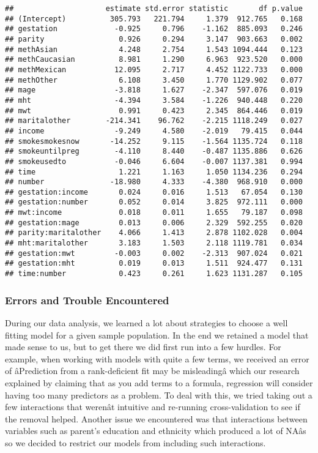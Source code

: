 \documentclass[]{article}
\begin{document}
\begin{verbatim}
##                     estimate std.error statistic       df p.value
## (Intercept)          305.793   221.794     1.379  912.765   0.168
## gestation             -0.925     0.796    -1.162  885.093   0.246
## parity                 0.926     0.294     3.147  903.663   0.002
## methAsian              4.248     2.754     1.543 1094.444   0.123
## methCaucasian          8.981     1.290     6.963  923.520   0.000
## methMexican           12.095     2.717     4.452 1122.733   0.000
## methOther              6.108     3.450     1.770 1129.902   0.077
## mage                  -3.818     1.627    -2.347  597.076   0.019
## mht                   -4.394     3.584    -1.226  940.448   0.220
## mwt                    0.991     0.423     2.345  864.446   0.019
## maritalother        -214.341    96.762    -2.215 1118.249   0.027
## income                -9.249     4.580    -2.019   79.415   0.044
## smokesmokesnow       -14.252     9.115    -1.564 1135.724   0.118
## smokeuntilpreg        -4.110     8.440    -0.487 1135.886   0.626
## smokeusedto           -0.046     6.604    -0.007 1137.381   0.994
## time                   1.221     1.163     1.050 1134.236   0.294
## number               -18.980     4.333    -4.380  968.910   0.000
## gestation:income       0.024     0.016     1.513   67.054   0.130
## gestation:number       0.052     0.014     3.825  972.111   0.000
## mwt:income             0.018     0.011     1.655   79.187   0.098
## gestation:mage         0.013     0.006     2.329  592.255   0.020
## parity:maritalother    4.066     1.413     2.878 1102.028   0.004
## mht:maritalother       3.183     1.503     2.118 1119.781   0.034
## gestation:mwt         -0.003     0.002    -2.313  907.024   0.021
## gestation:mht          0.019     0.013     1.511  924.477   0.131
## time:number            0.423     0.261     1.623 1131.287   0.105
\end{verbatim}

\subsubsection{Errors and Trouble
Encountered}\label{errors-and-trouble-encountered}

During our data analysis, we learned a lot about strategies to choose a
well fitting model for a given sample population. In the end we retained
a model that made sense to us, but to get there we did first run into a
few hurdles. For example, when working with models with quite a few
terms, we received an error of âPrediction from a rank-deficient fit
may be misleadingâ which our research explained by claiming that as
you add terms to a formula, regression will consider having too many
predictors as a problem. To deal with this, we tried taking out a few
interactions that werenât intuitive and re-running cross-validation to
see if the removal helped. Another issue we encountered was that
interactions between variables such as parent's education and ethnicity
which produced a lot of NAâs so we decided to restrict our models from
including such interactions.
\end{document}
